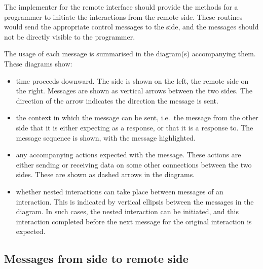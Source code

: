 The implementer for the remote interface should provide the methods for a
programmer to initiate the interactions from the remote side. These
routines would send the appropriate control messages to the {\eclipse}
side, and the messages should not be directly visible to the programmer. 

The usage of each message is summarised in the diagram(s) accompanying
them. These diagrams show:

\begin{itemize}
\item time proceeds downward. The {\eclipse} side is shown on the left,
the remote side on the right. Messages are shown as vertical arrows between
the two sides. The direction of the arrow indicates the direction the
message is sent.

\item the context in which the message can be sent, i.e.\ the message from
the other side that it is either expecting as a response, or that it is a
response to. The message sequence is shown, with the message highlighted.

\item any accompanying actions expected with the message. These actions are
either sending or receiving data on some other connections between the two
sides. These are shown as dashed arrows in the diagrams.

\item whether nested interactions can take place between messages of an interaction.
This is indicated by vertical ellipsis between the messages in
the diagram. In such cases, the nested interaction can be initiated, and this
interaction completed before the next message for the original interaction
is expected.
\end{itemize}

\subsection{Messages from {\eclipse} side to remote side}

